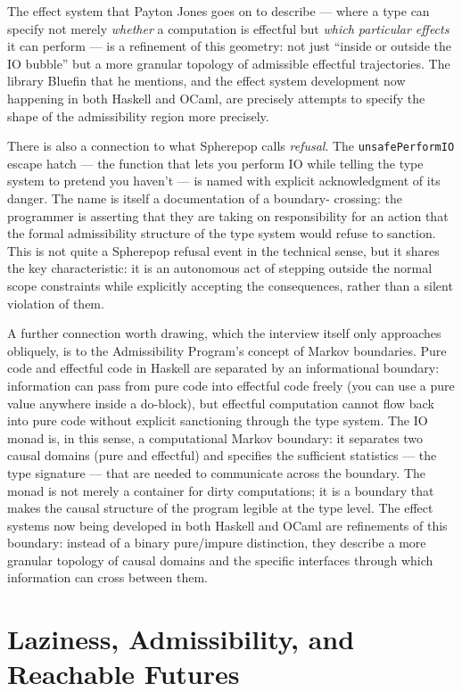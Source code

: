 \documentclass[12pt]{article}
\begin{document}
The effect system that Payton Jones goes on to describe — where a type can
specify not merely \emph{whether} a computation is effectful but \emph{which
particular effects} it can perform — is a refinement of this geometry: not just
``inside or outside the IO bubble'' but a more granular topology of admissible
effectful trajectories. The library Bluefin that he mentions, and the effect
system development now happening in both Haskell and OCaml, are precisely
attempts to specify the shape of the admissibility region more precisely.

There is also a connection to what Spherepop calls \emph{refusal}. The
\texttt{unsafePerformIO} escape hatch — the function that lets you perform IO
while telling the type system to pretend you haven't — is named with explicit
acknowledgment of its danger. The name is itself a documentation of a boundary-
crossing: the programmer is asserting that they are taking on responsibility for
an action that the formal admissibility structure of the type system would refuse
to sanction. This is not quite a Spherepop refusal event in the technical sense,
but it shares the key characteristic: it is an autonomous act of stepping outside
the normal scope constraints while explicitly accepting the consequences, rather
than a silent violation of them.

A further connection worth drawing, which the interview itself only approaches
obliquely, is to the Admissibility Program's concept of Markov boundaries.
Pure code and effectful code in Haskell are separated by an informational
boundary: information can pass from pure code into effectful code freely (you
can use a pure value anywhere inside a do-block), but effectful computation
cannot flow back into pure code without explicit sanctioning through the type
system. The IO monad is, in this sense, a computational Markov boundary: it
separates two causal domains (pure and effectful) and specifies the sufficient
statistics — the type signature — that are needed to communicate across the
boundary. The monad is not merely a container for dirty computations; it is a
boundary that makes the causal structure of the program legible at the type
level. The effect systems now being developed in both Haskell and OCaml are
refinements of this boundary: instead of a binary pure/impure distinction, they
describe a more granular topology of causal domains and the specific interfaces
through which information can cross between them.

\section{Laziness, Admissibility, and Reachable Futures}
\end{document}
